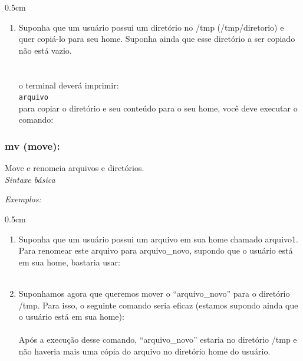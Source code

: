 \begin{refsection}
\begin {myindentpar}{0.5cm}
\begin{enumerate}[\itshape i.]
\item{Suponha que um usuário possui um diretório no /tmp (/tmp/diretorio) e quer copiá-lo para seu home. Suponha ainda que esse diretório a ser copiado não está vazio.}\\
 \\
 \\
o terminal deverá imprimir:\\
\userprompt{\\}
\texttt{arquivo}
\\
para copiar o diretório e seu conteúdo para o seu home, você deve executar o comando:\\

\end{enumerate}
\end{myindentpar}

\subsubsection{mv (move):}\label{tut1:text_mode:commands:mv}

 Move e renomeia arquivos e diretórios.\\

\textit{Sintaxe básica}


\textit{Exemplos:}
\begin {myindentpar}{0.5cm}
\begin{enumerate}[\itshape i.]

\item{Suponha que um usuário possui um arquivo em sua home chamado arquivo1. Para renomear este arquivo para arquivo\_novo, supondo que o usuário está em sua home, bastaria usar:}
\\
 \\
\item{Suponhamos agora que queremos mover o ``arquivo\_novo'' para o diretório /tmp. Para isso, o seguinte comando seria eficaz (estamos supondo ainda que o usuário está em sua home):}
\\
 \\
 Após a execução desse comando, ``arquivo\_novo'' estaria no diretório /tmp e não haveria mais uma cópia do arquivo no diretório home do usuário.\\

\end{enumerate}
\end{myindentpar}


\end{refsection}
